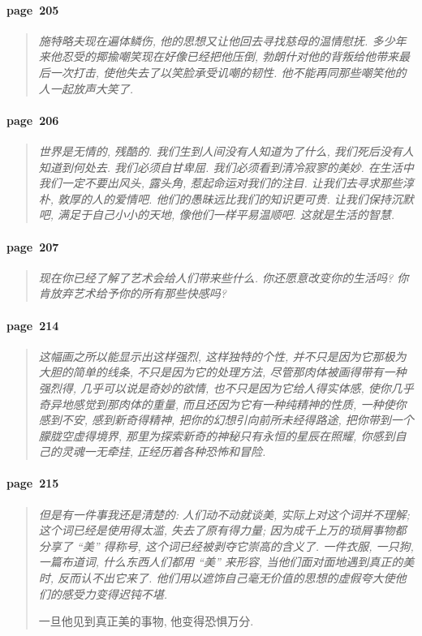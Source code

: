 \paragraph*{page~205}
\begin{quotation}
    \itshape
    施特略夫现在遍体鳞伤, 他的思想又让他回去寻找慈母的温情慰抚. 多少年来他忍受的揶揄嘲笑现在好像已经把他压倒, 勃朗什对他的背叛给他带来最后一次打击, 使他失去了以笑脸承受讥嘲的韧性. 他不能再同那些嘲笑他的人一起放声大笑了. 
\end{quotation}

\paragraph*{page~206}
\begin{quotation}
    \itshape
    世界是无情的, 残酷的. 我们生到人间没有人知道为了什么, 我们死后没有人知道到何处去. 我们必须自甘卑屈. 我们必须看到清冷寂寥的美妙. 在生活中我们一定不要出风头, 露头角, 惹起命运对我们的注目. 让我们去寻求那些淳朴, 敦厚的人的爱情吧. 他们的愚昧远比我们的知识更可贵. 让我们保持沉默吧, 满足于自己小小的天地, 像他们一样平易温顺吧. 这就是生活的智慧. 
\end{quotation}

\paragraph*{page~207}
\begin{quotation}
    \itshape
    现在你已经了解了艺术会给人们带来些什么. 你还愿意改变你的生活吗? 你肯放弃艺术给予你的所有那些快感吗?
\end{quotation}

\paragraph*{page~214}
\begin{quotation}
    \itshape
    这幅画之所以能显示出这样强烈, 这样独特的个性, 并不只是因为它那极为大胆的简单的线条, 不只是因为它的处理方法, 尽管那肉体被画得带有一种强烈得, 几乎可以说是奇妙的欲情, 也不只是因为它给人得实体感, 使你几乎奇异地感觉到那肉体的重量, 而且还因为它有一种纯精神的性质, 一种使你感到不安, 感到新奇得精神, 把你的幻想引向前所未经得路途, 把你带到一个朦胧空虚得境界, 那里为探索新奇的神秘只有永恒的星辰在照耀, 你感到自己的灵魂一无牵挂, 正经历着各种恐怖和冒险. 
\end{quotation}

\paragraph*{page~215}
\begin{quotation}
    \itshape
    但是有一件事我还是清楚的: 人们动不动就谈美, 实际上对这个词并不理解; 这个词已经是使用得太滥, 失去了原有得力量; 因为成千上万的琐屑事物都分享了 ``美'' 得称号, 这个词已经被剥夺它崇高的含义了. 一件衣服, 一只狗, 一篇布道词, 什么东西人们都用 ``美'' 来形容, 当他们面对面地遇到真正的美时, 反而认不出它来了. 他们用以遮饰自己毫无价值的思想的虚假夸大使他们的感受力变得迟钝不堪. 

    一旦他见到真正美的事物, 他变得恐惧万分. 
\end{quotation}

